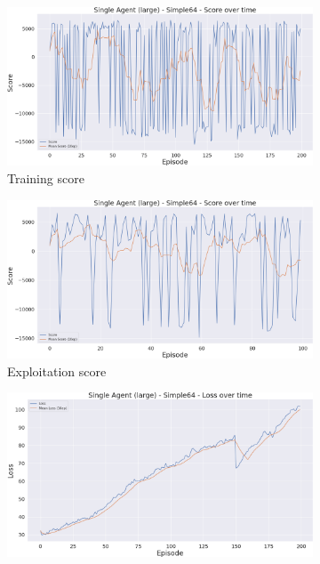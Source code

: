 \begin{figure}[h]
    \centering
    \begin{subfigure}[b]{0.495\textwidth}
        \includegraphics[width=1\textwidth]{figs/single_dqn_l_200/score.png}
        \caption{Training score}
    \end{subfigure}
    \begin{subfigure}[b]{0.495\textwidth}
        \includegraphics[width=1\textwidth]{figs/single_dqn_l_200/exploit/score.png}
        \caption{Exploitation score}
    \end{subfigure}
    \begin{subfigure}[b]{0.495\textwidth}
        \includegraphics[width=1\textwidth]{figs/single_dqn_l_200/loss.png}

\end{subfigure}
\end{figure}
